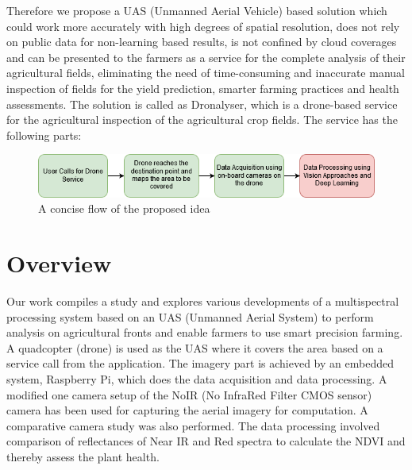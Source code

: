 Therefore we propose a UAS (Unmanned Aerial Vehicle) based solution which could work more accurately with high degrees of spatial resolution, does not rely on public data for non-learning based results, is not confined by cloud coverages and can be presented to the farmers as a service for the complete analysis of their agricultural fields, eliminating the need of time-consuming and inaccurate manual inspection of fields for the yield prediction, smarter farming practices and health assessments. The solution is called as Dronalyser, which is a drone-based service for the agricultural inspection of the agricultural crop fields. The service has the following parts:




\begin{figure}[H]
    \centering
    \includegraphics[width=\linewidth]{SummerInterReport/project/Images-Major/Intro_Flow.png}
    \caption{A concise flow of the proposed idea}
    \label{fig:Concise Flow}
\end{figure}

\section{Overview}

Our work compiles a study and explores various developments of a multispectral processing system based on an UAS (Unmanned Aerial System) to perform analysis on agricultural fronts and enable farmers to use smart precision farming. A quadcopter (drone) is used as the UAS where it covers the area based on a service call from the application. The imagery part is achieved by an embedded system, Raspberry Pi, which does the data acquisition and data processing. A modified one camera setup of the NoIR (No InfraRed Filter CMOS sensor) camera has been used for capturing the aerial imagery for computation. A comparative camera study was also performed. The data processing involved comparison of reflectances of Near IR and Red spectra to calculate the NDVI and thereby assess the plant health.


